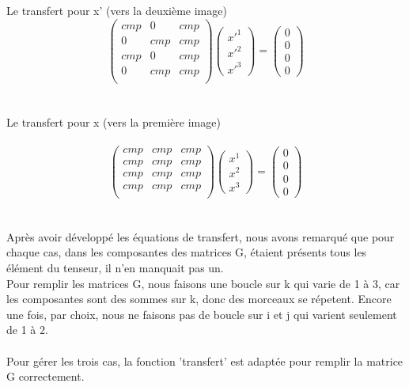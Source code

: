 \documentclass[a4paper,11pt,fleqn]{report}
\begin{document}
	\\\\Le transfert pour x' (vers la deuxi\`eme image)\\
	$$ \begin{pmatrix}
	cmp&0&cmp \\
	0&cmp&cmp \\
	cmp&0&cmp \\
	0&cmp&cmp \\
	\end{pmatrix}\begin{pmatrix}x'^1\\x'^2\\x'^3\end{pmatrix} = \begin{pmatrix}0\\0\\0\\0\end{pmatrix} $$
	\\\\Le transfert pour x (vers la premi\`ere image)\\\\
	$$ \begin{pmatrix}
	cmp&cmp&cmp \\
	cmp&cmp&cmp \\
	cmp&cmp&cmp \\
	cmp&cmp&cmp \\
	\end{pmatrix}\begin{pmatrix}x^1\\x^2\\x^3\end{pmatrix} = \begin{pmatrix}0\\0\\0\\0\end{pmatrix} $$
	\\\\Apr\`es avoir d\'evelopp\'e les \'equations de transfert, nous avons remarqu\'e que pour chaque cas, 
	dans les composantes des matrices G, \'etaient pr\'esents tous les \'el\'ement du tenseur, il n'en manquait pas un.\\Pour remplir les matrices G, nous faisons une boucle sur k qui varie de 1 \`a 3, car les composantes sont des sommes sur k, donc des morceaux se r\'epetent. Encore une fois, par choix, nous ne faisons pas de boucle sur i et j qui varient seulement de 1 \`a 2.\\\\
	Pour g\'erer les trois cas, la fonction 'transfert' est adapt\'ee pour remplir la matrice G correctement.
	
\end{document}
